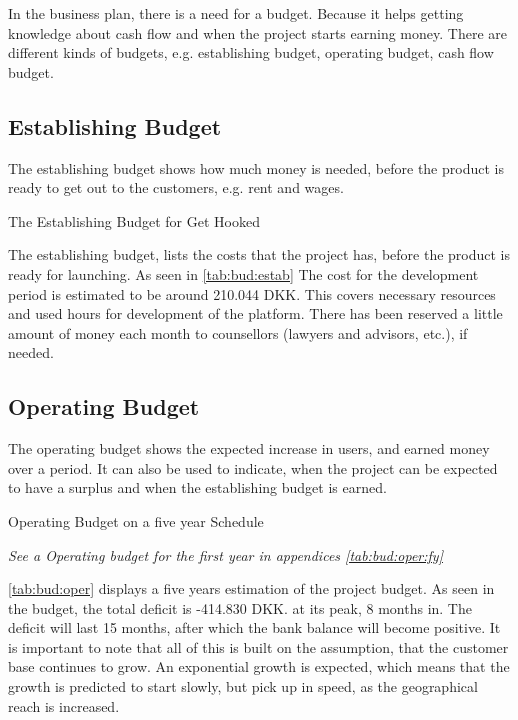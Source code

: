 In the business plan, there is a need for a budget. Because it helps getting knowledge about cash flow and when the project starts earning money. There are different kinds of budgets, e.g. establishing budget, operating budget, cash flow budget.


\subsection{Establishing Budget}
The establishing budget shows how much money is needed, before the product is ready to get out to the customers, e.g. rent and wages.


\begin{table}[H]
\centering
\caption{The Establishing Budget for Get Hooked}
\label{tab:bud:estab}

\end{table}

The establishing budget, lists the costs that the project has, before the product is ready for launching. As seen in \autoref{tab:bud:estab} The cost for the development period is estimated to be around 210.044 DKK. This covers necessary resources and used hours for development of the platform. There has been reserved a little amount of money each month to counsellors (lawyers and advisors, etc.), if needed.

\subsection{Operating Budget}

The operating budget shows the expected increase in users, and earned money over a period. It can also be used to indicate, when the project can be expected to have a surplus and when the establishing budget is earned.

\begin{table*}[t!]
\centering
\caption{Operating Budget on a five year Schedule}
\label{tab:bud:oper}

\textit{See a Operating budget for the first year in appendices \ref{tab:bud:oper:fy}}
\end{table*}


\autoref{tab:bud:oper} displays a five years estimation of the project budget. As seen in the budget, the total deficit is -414.830 DKK. at its peak, 8 months in. The deficit will last 15 months, after which the bank balance will become positive. It is important to note that all of this is built on the assumption, that the customer base continues to grow. An exponential  growth is expected, which means that the growth is predicted to start slowly, but pick up in speed, as the geographical reach is increased.

